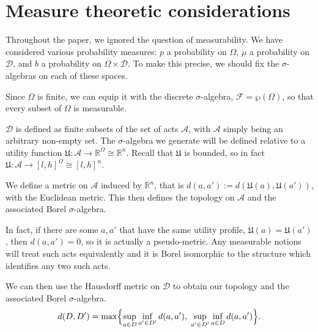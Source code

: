 \documentclass[a4paper,final]{article}
\newcommand\A{\mathcal{A}}
\newcommand\U{\mathfrak{U}} %
\newcommand{\Decs}{\mathcal{D}}
\renewcommand{\Re}{\mathbb{R}}
\renewcommand{\color}[1]{}
\newenvironment{colored}[1]{\leavevmode\color{#1}}{}
\newcommand\SetDelimiter[1][]{
	\nonscript\,#1\vert \allowbreak \nonscript\,\mathopen{}}
\providecommand\given{\SetDelimiter}
\renewcommand{\emptyset}{\varnothing}
\newenvironment{CCM rewritten}
{\begingroup\color{blue}} %
{\endgroup}              %
\begin{document}
\begin{colored}{violet}
	

	
	\section{Measure theoretic considerations}\label{sect:appendix:measure}
	Throughout the paper, we ignored the question of measurability. We have considered various probability measures: $p$ a probability on $\Omega$, $\mu$ a probability on $\Decs$, and $b$ a probability on $\Omega\times\Decs$. To make this precise, we should fix the $\sigma$-algebras on each of these spaces.
	
	Since $\Omega$ is finite, we can equip it with the discrete $\sigma$-algebra, $\mathcal{F}=\wp(\Omega)$, so that every subset of $\Omega$ is measurable. 	
	
	$\Decs$ is defined as finite subsets of the set of acts $\A$, with $\A$ simply being an arbitrary non-empty set. 
	The $\sigma$-algebra we generate will be defined relative to a utility function $\U:\A\to\Re^\Omega\cong\Re^n$. Recall that $\U$ is bounded, so in fact $\U:\A\to[l,h]^\Omega\cong[l,h]^n$.	
	
	
		We define a metric on $\A$ induced by $\Re^n$, that is $d(a,a'):=d(\U(a),\U(a'))$, with the Euclidean metric. 
	This then defines the topology on $\A$ and the associated Borel $\sigma$-algebra. 
	
	In fact, if there are some $a,a'$ that have the same utility profile, $\U(a)=\U(a')$, then $d(a,a')=0$, so it is actually a pseudo-metric. Any measurable notions will treat such acts equivalently and it is Borel isomorphic to the structure which identifies any two such acts.
	
	We can then use the Hausdorff metric on $\Decs$ to obtain our topology and the associated Borel $\sigma$-algebra.
	  \[
	d(D, D') = \max\Bigl\{
	\sup_{a \in D}\inf_{a' \in D'}d(a,a'),
	\;\sup_{a' \in D'}\inf_{a \in D}d(a,a')
	\Bigr\}.
	\]
	
	
	

	


\end{colored}
\end{document}
